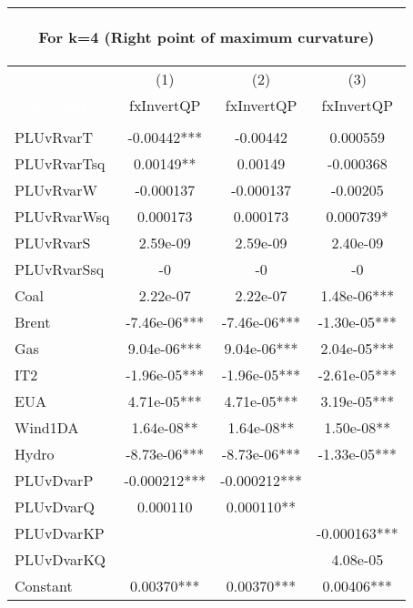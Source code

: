 \begin{center}
\begin{tabular}{lccc}
\multicolumn{4}{c}{\begin{large}For k=4 (Right point of maximum curvature)\end{large}} \\ \midrule
 & (1) & (2) & (3) \\
\textcolor{white}{VARIABLES} & fxInvertQP & fxInvertQP & fxInvertQP \\ \midrule
\vspace{4pt} & \begin{footnotesize}\end{footnotesize} & \begin{footnotesize}\end{footnotesize} & \begin{footnotesize}\end{footnotesize} \\
PLUvRvarT & -0.00442*** & -0.00442 & 0.000559 \\
PLUvRvarTsq & 0.00149** & 0.00149 & -0.000368 \\
PLUvRvarW & -0.000137 & -0.000137 & -0.00205 \\
PLUvRvarWsq & 0.000173 & 0.000173 & 0.000739* \\
PLUvRvarS & 2.59e-09 & 2.59e-09 & 2.40e-09 \\
PLUvRvarSsq & -0 & -0 & -0 \\
Coal & 2.22e-07 & 2.22e-07 & 1.48e-06*** \\
Brent & -7.46e-06*** & -7.46e-06*** & -1.30e-05*** \\
Gas & 9.04e-06*** & 9.04e-06*** & 2.04e-05*** \\
IT2 & -1.96e-05*** & -1.96e-05*** & -2.61e-05*** \\
EUA & 4.71e-05*** & 4.71e-05*** & 3.19e-05*** \\
Wind1DA & 1.64e-08** & 1.64e-08** & 1.50e-08** \\
Hydro & -8.73e-06*** & -8.73e-06*** & -1.33e-05*** \\
PLUvDvarP & -0.000212*** & -0.000212*** &  \\
PLUvDvarQ & 0.000110 & 0.000110** &  \\
PLUvDvarKP &  &  & -0.000163*** \\
PLUvDvarKQ &  &  & 4.08e-05 \\
Constant & 0.00370*** & 0.00370*** & 0.00406*** \\

\end{tabular}
\end{center}
